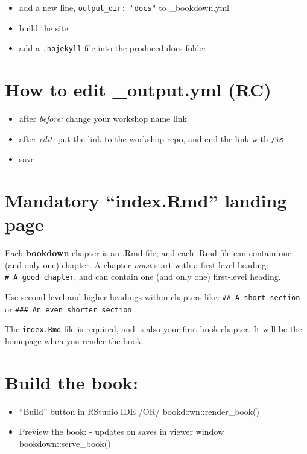 \documentclass[
]{book}
\providecommand{\tightlist}{%
  \setlength{\itemsep}{0pt}\setlength{\parskip}{0pt}}
\theoremstyle{definition}
\theoremstyle{definition}
\theoremstyle{definition}
\theoremstyle{definition}
\theoremstyle{remark}
\begin{document}
\begin{itemize}
\tightlist
\item
  add a new line, \texttt{output\_dir:\ "docs"} to \_bookdown.yml
\item
  build the site
\item
  add a \texttt{.nojekyll} file into the produced docs folder
\end{itemize}

\section{How to edit \_output.yml (RC)}\label{how-to-edit-_output.yml-rc}

\begin{itemize}
\tightlist
\item
  after \emph{before:} change your workshop name link
\item
  after \emph{edit:} put the link to the workshop repo, and end the link with \texttt{/\%s}
\item
  save
\end{itemize}

\section{Mandatory ``index.Rmd'' landing page}\label{mandatory-index.rmd-landing-page}

Each \textbf{bookdown} chapter is an .Rmd file, and each .Rmd file can contain one (and only one) chapter. A chapter \emph{must} start with a first-level heading: \texttt{\#\ A\ good\ chapter}, and can contain one (and only one) first-level heading.

Use second-level and higher headings within chapters like: \texttt{\#\#\ A\ short\ section} or \texttt{\#\#\#\ An\ even\ shorter\ section}.

The \texttt{index.Rmd} file is required, and is also your first book chapter. It will be the homepage when you render the book.

\section{Build the book:}\label{build-the-book-1}

\begin{itemize}
\tightlist
\item
  ``Build'' button in RStudio IDE /OR/ bookdown::render\_book()
\item
  Preview the book: - updates on saves in viewer window bookdown::serve\_book()
\end{itemize}
\end{document}
